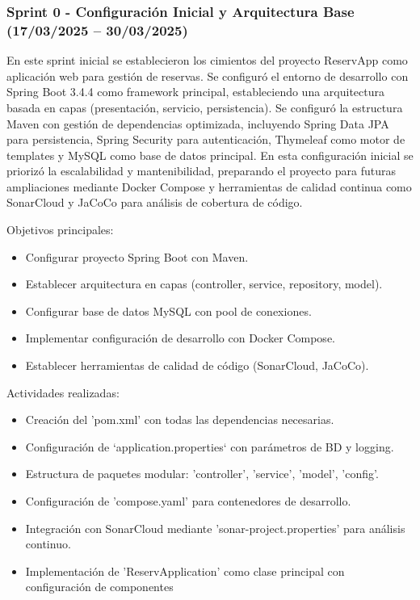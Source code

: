 \subsubsection{Sprint 0 - Configuración Inicial y Arquitectura Base (17/03/2025 – 30/03/2025)} 
En este sprint inicial se establecieron los cimientos del proyecto ReservApp como aplicación web para gestión de reservas. Se configuró el entorno de desarrollo con Spring Boot 3.4.4 como framework principal, estableciendo una arquitectura basada en capas (presentación, servicio, persistencia). Se configuró la estructura Maven con gestión de dependencias optimizada, incluyendo Spring Data JPA para persistencia, Spring Security para autenticación, Thymeleaf como motor de templates y MySQL como base de datos principal. En esta configuración inicial se priorizó la escalabilidad y mantenibilidad, preparando el proyecto para futuras ampliaciones mediante Docker Compose y herramientas de calidad continua como SonarCloud y JaCoCo para análisis de cobertura de código.

Objetivos principales:
\begin{itemize}
\tightlist
\item
Configurar proyecto Spring Boot con Maven.
\item
Establecer arquitectura en capas (controller, service, repository, model).
\item
Configurar base de datos MySQL con pool de conexiones.
\item
Implementar configuración de desarrollo con Docker Compose.
\item
Establecer herramientas de calidad de código (SonarCloud, JaCoCo).
\end{itemize}

Actividades realizadas:
\begin{itemize}
\tightlist
\item
Creación del 'pom.xml' con todas las dependencias necesarias.
\item
Configuración de `application.properties` con parámetros de BD y logging.
\item
Estructura de paquetes modular: 'controller', 'service', 'model', 'config'.
\item
Configuración de 'compose.yaml' para contenedores de desarrollo.
\item
Integración con SonarCloud mediante 'sonar-project.properties' para análisis continuo.
\item
Implementación de 'ReservApplication' como clase principal con configuración de componentes
\end{itemize}


